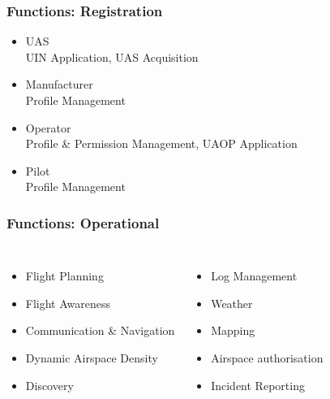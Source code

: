 \documentclass[usenames,dvipsnames,aspectratio=169,serif]{beamer}
\begin{document}

\begin{frame}
  \frametitle{Functions: Registration}
\begin{itemize}
\item UAS \\
	UIN Application, UAS Acquisition
\item Manufacturer \\
	Profile Management

\item Operator \\
	Profile \& Permission Management, UAOP Application

\item Pilot \\
	Profile Management
\end{itemize}
\end{frame}


\begin{frame}
  \frametitle{Functions: Operational}
\begin{columns}[c] %

\begin{itemize}
\item Flight Planning
\item Flight Awareness
\item Communication \& Navigation
\item Dynamic Airspace Density
\item Discovery
\end{itemize}

\begin{itemize}
\item Log Management
\item Weather
\item Mapping
\item Airspace authorisation
\item Incident Reporting
\end{itemize}
\end{columns}
\end{frame}
\end{document}
